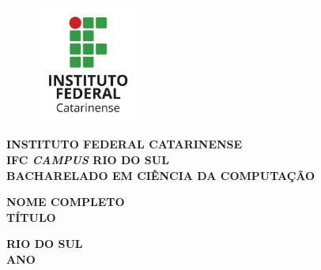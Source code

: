 \begin{titlepage}
  \begin{figure}[htb]			
	  \centering
	  \includegraphics[width=0.30\textwidth]{Imagens/Logo/if.png}
  \end{figure}
  \begin{center}
    \textbf{INSTITUTO FEDERAL CATARINENSE}\\
    \textbf{IFC \textit{CAMPUS} RIO DO SUL}\\
    \textbf{BACHARELADO EM CIÊNCIA DA COMPUTAÇÃO}\\

  \end{center}

 
\centering
	\begin{center}
	
		\vfill
		\textbf{NOME COMPLETO \\} 
\vfill
		\textbf{TÍTULO}\\
		
		
		
		
	\end{center}
	 \vfill
		
			\textbf{RIO DO SUL \\ ANO}
\end{titlepage}
